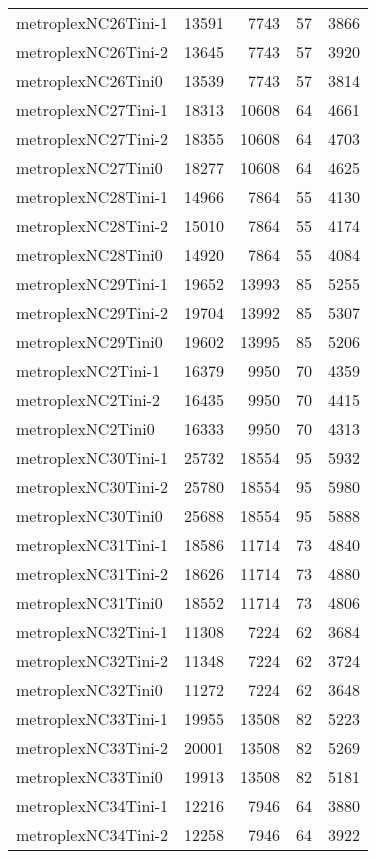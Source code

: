 \begin{longtable}{lrrrr}
metroplexNC26Tini-1 & 13591 & 7743 & 57 & 3866 \\
metroplexNC26Tini-2 & 13645 & 7743 & 57 & 3920 \\
metroplexNC26Tini0 & 13539 & 7743 & 57 & 3814 \\
metroplexNC27Tini-1 & 18313 & 10608 & 64 & 4661 \\
metroplexNC27Tini-2 & 18355 & 10608 & 64 & 4703 \\
metroplexNC27Tini0 & 18277 & 10608 & 64 & 4625 \\
metroplexNC28Tini-1 & 14966 & 7864 & 55 & 4130 \\
metroplexNC28Tini-2 & 15010 & 7864 & 55 & 4174 \\
metroplexNC28Tini0 & 14920 & 7864 & 55 & 4084 \\
metroplexNC29Tini-1 & 19652 & 13993 & 85 & 5255 \\
metroplexNC29Tini-2 & 19704 & 13992 & 85 & 5307 \\
metroplexNC29Tini0 & 19602 & 13995 & 85 & 5206 \\
metroplexNC2Tini-1 & 16379 & 9950 & 70 & 4359 \\
metroplexNC2Tini-2 & 16435 & 9950 & 70 & 4415 \\
metroplexNC2Tini0 & 16333 & 9950 & 70 & 4313 \\
metroplexNC30Tini-1 & 25732 & 18554 & 95 & 5932 \\
metroplexNC30Tini-2 & 25780 & 18554 & 95 & 5980 \\
metroplexNC30Tini0 & 25688 & 18554 & 95 & 5888 \\
metroplexNC31Tini-1 & 18586 & 11714 & 73 & 4840 \\
metroplexNC31Tini-2 & 18626 & 11714 & 73 & 4880 \\
metroplexNC31Tini0 & 18552 & 11714 & 73 & 4806 \\
metroplexNC32Tini-1 & 11308 & 7224 & 62 & 3684 \\
metroplexNC32Tini-2 & 11348 & 7224 & 62 & 3724 \\
metroplexNC32Tini0 & 11272 & 7224 & 62 & 3648 \\
metroplexNC33Tini-1 & 19955 & 13508 & 82 & 5223 \\
metroplexNC33Tini-2 & 20001 & 13508 & 82 & 5269 \\
metroplexNC33Tini0 & 19913 & 13508 & 82 & 5181 \\
metroplexNC34Tini-1 & 12216 & 7946 & 64 & 3880 \\
metroplexNC34Tini-2 & 12258 & 7946 & 64 & 3922 \\

\end{longtable}
